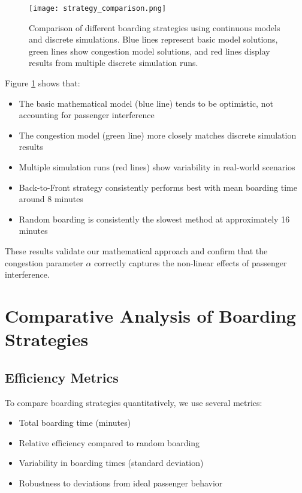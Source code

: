 \documentclass[12pt,a4paper]{article}
\begin{document}
\begin{figure}[H]
\centering
\texttt{[image: strategy\_comparison.png]}
\caption{Comparison of different boarding strategies using continuous models and discrete simulations. Blue lines represent basic model solutions, green lines show congestion model solutions, and red lines display results from multiple discrete simulation runs.}
\label{fig:strategy_comparison}
\end{figure}

Figure \ref{fig:strategy_comparison} shows that:
\begin{itemize}
    \item The basic mathematical model (blue line) tends to be optimistic, not accounting for passenger interference
    \item The congestion model (green line) more closely matches discrete simulation results
    \item Multiple simulation runs (red lines) show variability in real-world scenarios
    \item Back-to-Front strategy consistently performs best with mean boarding time around 8 minutes
    \item Random boarding is consistently the slowest method at approximately 16 minutes
\end{itemize}

These results validate our mathematical approach and confirm that the congestion parameter $\alpha$ correctly captures the non-linear effects of passenger interference.

\section{Comparative Analysis of Boarding Strategies}

\subsection{Efficiency Metrics}
To compare boarding strategies quantitatively, we use several metrics:
\begin{itemize}
    \item Total boarding time (minutes)
    \item Relative efficiency compared to random boarding
    \item Variability in boarding times (standard deviation)
    \item Robustness to deviations from ideal passenger behavior
\end{itemize}
\end{document}
